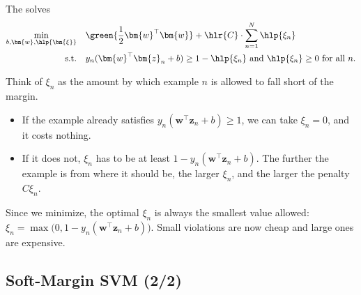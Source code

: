 \begin{definition}
    The  solves
    \[
        \begin{aligned}
            \min_{b, \bm{w}, \hlp{\bm{\xi}}} \quad & \green{\frac{1}{2}
                \bm{w}^\top \bm{w}} + \hlr{C} \cdot \sum_{n=1}^N \hlp{\xi_n}\\
            \text{s.t.} \quad & y_n (\bm{w}^\top \bm{z}_n + b) \ge 1 -
                \hlp{\xi_n} \text{ and } \hlp{\xi_n} \ge 0 \text{ for all }
                n.
        \end{aligned}
    \]
\end{definition}

Think of \(\xi_n\) as the amount by which example \(n\) is allowed to fall
short of the margin.
\begin{itemize}
    \item If the example already satisfies \(y_n (\bm{w}^\top \bm{z}_n + b)
        \ge 1\), we can take \(\xi_n = 0\), and it costs nothing.
    \item If it does not, \(\xi_n\) has to be at least \(1 - y_n
        (\bm{w}^\top \bm{z}_n + b)\). The further the example is from where
        it should be, the larger \(\xi_n\), and the larger the penalty \(C
        \xi_n\).
\end{itemize}
Since we minimize, the optimal \(\xi_n\) is always the smallest value
allowed: \(\xi_n = \max\bigl(0, 1 - y_n (\bm{w}^\top \bm{z}_n +
b)\bigr)\). Small violations are now cheap and large ones are expensive.

\subsection{Soft-Margin SVM (2/2)}\label{sec:soft-geometry}

